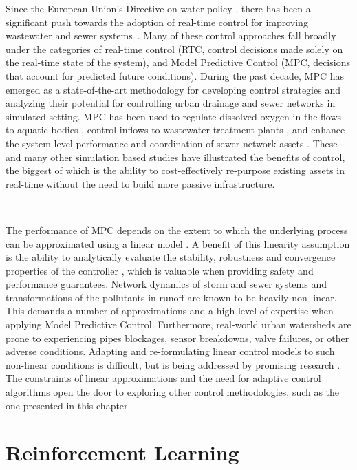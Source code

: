 Since the European Union’s Directive on water policy \cite{TheEuropeanParliamentandthecouncilofEuropeanUnion2000DirectivePolicy}, there has been a significant push towards the adoption of real-time control for improving wastewater and sewer systems~\cite{Schutze2004RealToday,Mollerup2016}.
Many of these control approaches fall broadly under the categories of real-time control (RTC, control decisions made solely on the real-time state of the system), and Model Predictive Control (MPC, decisions that account for predicted future conditions).
During the past decade, MPC has emerged as a state-of-the-art methodology for developing control strategies and analyzing their potential for controlling urban drainage and sewer networks in simulated setting.
MPC has been used to regulate dissolved oxygen in the flows to aquatic bodies \cite{Mahmoodian2017Pollution-basedPropagation}, control inflows to wastewater treatment plants \cite{pleau2005global}, and enhance the system-level performance and coordination of sewer network assets \cite{Mollerup2016,Meneses2018CoordinatingDenmark}.
These and many other simulation based studies \cite{wong2018real} have illustrated the benefits of control, the biggest of which is the ability to cost-effectively re-purpose existing assets in real-time without the need to build more passive infrastructure.

\

The performance of MPC depends on the extent to which the underlying process can be approximated using a linear model \cite{van2006model}.
A benefit of this linearity assumption is the ability to analytically evaluate the stability, robustness and convergence properties of the controller \cite{Ogata201}, which is valuable when providing safety and performance guarantees.
Network dynamics of storm and sewer systems and transformations of the pollutants in runoff are known to be heavily non-linear.
This demands a number of approximations and a high level of expertise when applying Model Predictive Control.
Furthermore, real-world urban watersheds are prone to experiencing pipes blockages, sensor breakdowns, valve failures, or other adverse conditions.
Adapting and re-formulating linear control models to such non-linear conditions is difficult, but is being addressed by promising research \cite{wong2018real}.
The constraints of linear approximations and the need for adaptive control algorithms open the door to exploring other control methodologies, such as the one presented in this chapter.

\section{Reinforcement Learning}

